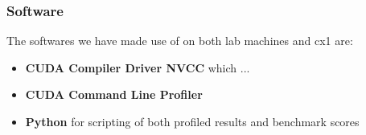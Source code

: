 \subsubsection*{Software}
The softwares we have made use of on both lab machines and cx1 are:
\begin{itemize}
  \item \textbf{CUDA Compiler Driver NVCC} which ...
  \item \textbf{CUDA Command Line Profiler}
  \item \textbf{Python} for scripting of both profiled results and benchmark scores
\end{itemize}